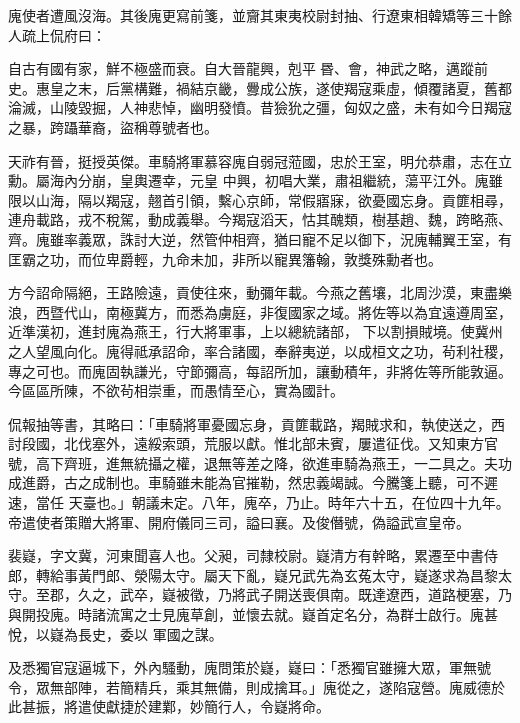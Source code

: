 \begin{pinyinscope}
 廆使者遭風沒海。其後廆更寫前箋，並齎其東夷校尉封抽、行遼東相韓矯等三十餘人疏上侃府曰：



 自古有國有家，鮮不極盛而衰。自大晉龍興，剋平昬、會，神武之略，邁蹤前史。惠皇之末，后黨構難，禍結京畿，釁成公族，遂使羯寇乘虛，傾覆諸夏，舊都淪滅，山陵毀掘，人神悲悼，幽明發憤。昔獫狁之彊，匈奴之盛，未有如今日羯寇之暴，跨躡華裔，盜稱尊號者也。



 天祚有晉，挺授英傑。車騎將軍慕容廆自弱冠蒞國，忠於王室，明允恭肅，志在立勳。屬海內分崩，皇輿遷幸，元皇
 中興，初唱大業，肅祖繼統，蕩平江外。廆雖限以山海，隔以羯寇，翹首引領，繫心京師，常假寤寐，欲憂國忘身。貢篚相尋，連舟載路，戎不稅駕，動成義舉。今羯寇滔天，怙其醜類，樹基趙、魏，跨略燕、齊。廆雖率義眾，誅討大逆，然管仲相齊，猶曰寵不足以御下，況廆輔翼王室，有匡霸之功，而位卑爵輕，九命未加，非所以寵異籓翰，敦獎殊勳者也。



 方今詔命隔絕，王路險遠，貢使往來，動彌年載。今燕之舊壤，北周沙漠，東盡樂浪，西暨代山，南極冀方，而悉為虜庭，非復國家之域。將佐等以為宜遠遵周室，近準漢初，進封廆為燕王，行大將軍事，上以總統諸部，
 下以割損賊境。使冀州之人望風向化。廆得祗承詔命，率合諸國，奉辭夷逆，以成桓文之功，茍利社稷，專之可也。而廆固執謙光，守節彌高，每詔所加，讓動積年，非將佐等所能敦逼。今區區所陳，不欲茍相崇重，而愚情至心，實為國計。



 侃報抽等書，其略曰：「車騎將軍憂國忘身，貢篚載路，羯賊求和，執使送之，西討段國，北伐塞外，遠綏索頭，荒服以獻。惟北部未賓，屢遣征伐。又知東方官號，高下齊班，進無統攝之權，退無等差之降，欲進車騎為燕王，一二具之。夫功成進爵，古之成制也。車騎雖未能為官摧勒，然忠義竭誠。今騰箋上聽，可不遲速，當任
 天臺也。」朝議未定。八年，廆卒，乃止。時年六十五，在位四十九年。帝遣使者策贈大將軍、開府儀同三司，謚曰襄。及俊僭號，偽謚武宣皇帝。



 裴嶷，字文冀，河東聞喜人也。父昶，司隸校尉。嶷清方有幹略，累遷至中書侍郎，轉給事黃門郎、滎陽太守。屬天下亂，嶷兄武先為玄菟太守，嶷遂求為昌黎太守。至郡，久之，武卒，嶷被徵，乃將武子開送喪俱南。既達遼西，道路梗塞，乃與開投廆。時諸流寓之士見廆草創，並懷去就。嶷首定名分，為群士啟行。廆甚悅，以嶷為長史，委以
 軍國之謀。



 及悉獨官寇逼城下，外內騷動，廆問策於嶷，嶷曰：「悉獨官雖擁大眾，軍無號令，眾無部陣，若簡精兵，乘其無備，則成擒耳。」廆從之，遂陷寇營。廆威德於此甚振，將遣使獻捷於建鄴，妙簡行人，令嶷將命。




\end{pinyinscope}

